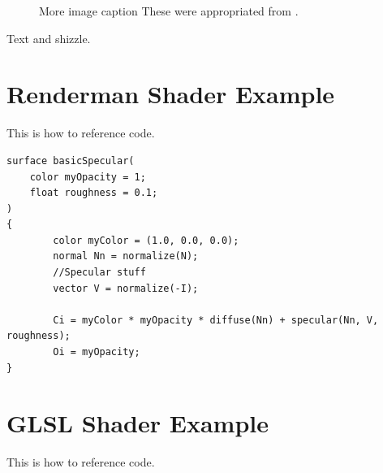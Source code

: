 \documentclass[]{acmsiggraph}
\begin{document}
\begin{figure}[htbp]
  \centering
 \hfill
 \caption{\label{fig:comparison}More image caption These were appropriated from \protect\cite{renderman16}.}
\end{figure}

Text and shizzle.




\newpage
\appendix
\section{Renderman Shader Example}\label{app:renderman}
This is how to reference code.
\begin{lstlisting}[language=rendermansl, label={lst:renderman}, caption={Renderman example lifted from \protect\cite{renderman16}.}]
surface basicSpecular(
    color myOpacity = 1; 
    float roughness = 0.1;
)
{
        color myColor = (1.0, 0.0, 0.0);
        normal Nn = normalize(N);
        //Specular stuff
        vector V = normalize(-I);
        
        Ci = myColor * myOpacity * diffuse(Nn) + specular(Nn, V, roughness);
        Oi = myOpacity;
} 
\end{lstlisting}


\section{GLSL Shader Example}\label{app:glsl}
This is how to reference code.
\end{document}
